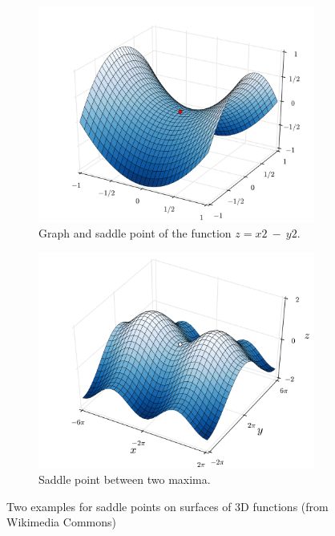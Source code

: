 			\begin{figure}[h]
				\begin{subfigure}{.5\textwidth}
				\centering
				\includegraphics[width=1\linewidth]{Figures/Saddle_point.png}
				\caption{Graph and saddle point of the function $z=x2~-~y2$.}\label{fig:saddle_point} 
			\end{subfigure}
				\begin{subfigure}{.5\textwidth}
				\centering
				\includegraphics[width=1\linewidth]{Figures/Saddle_Point_between_maxima.png}
				\caption{Saddle point between two maxima.}\label{fig:saddle_point_between_maxima} 
				\end{subfigure}
				\caption{Two examples for saddle points on surfaces of 3D functions (from Wikimedia Commons)}\label{fig:saddle_points_general}
			\end{figure}		
